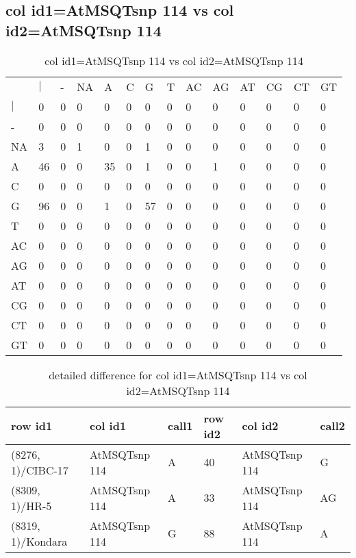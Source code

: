 \subsection{col id1=AtMSQTsnp 114 vs col id2=AtMSQTsnp 114}
\begin{center}
\begin{longtable}{|l|l|l|l|l|l|l|l|l|l|l|l|l|l|}
\caption{col id1=AtMSQTsnp 114 vs col id2=AtMSQTsnp 114} \label{table_dm498}\\
\hline
\\
\hline
&$|$&-&NA&A&C&G&T&AC&AG&AT&CG&CT&GT\\
$|$&0&0&0&0&0&0&0&0&0&0&0&0&0\\
-&0&0&0&0&0&0&0&0&0&0&0&0&0\\
NA&3&0&1&0&0&1&0&0&0&0&0&0&0\\
A&46&0&0&35&0&1&0&0&1&0&0&0&0\\
C&0&0&0&0&0&0&0&0&0&0&0&0&0\\
G&96&0&0&1&0&57&0&0&0&0&0&0&0\\
T&0&0&0&0&0&0&0&0&0&0&0&0&0\\
AC&0&0&0&0&0&0&0&0&0&0&0&0&0\\
AG&0&0&0&0&0&0&0&0&0&0&0&0&0\\
AT&0&0&0&0&0&0&0&0&0&0&0&0&0\\
CG&0&0&0&0&0&0&0&0&0&0&0&0&0\\
CT&0&0&0&0&0&0&0&0&0&0&0&0&0\\
GT&0&0&0&0&0&0&0&0&0&0&0&0&0\\
\hline
\end{longtable}
\end{center}

\begin{center}
\begin{longtable}{|l|l|l|l|l|l|}
\caption{detailed difference for col id1=AtMSQTsnp 114 vs col id2=AtMSQTsnp 114} \label{table_dm499}\\
\hline
row id1&col id1&call1&row id2&col id2&call2\\
\hline
(8276, 1)/CIBC-17&AtMSQTsnp 114&A&40&AtMSQTsnp 114&G\\
(8309, 1)/HR-5&AtMSQTsnp 114&A&33&AtMSQTsnp 114&AG\\
(8319, 1)/Kondara&AtMSQTsnp 114&G&88&AtMSQTsnp 114&A\\
\hline
\end{longtable}
\end{center}

